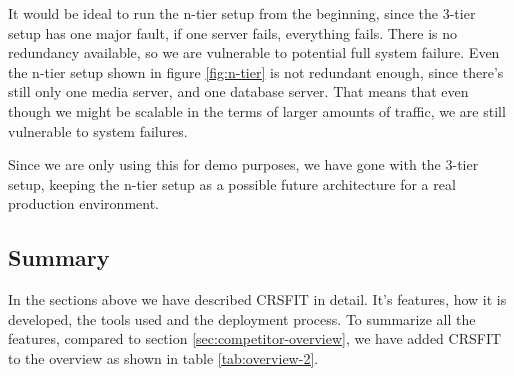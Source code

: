 It would be ideal to run the n-tier setup from the beginning, since the 3-tier setup has one major fault, if one server fails, everything fails. There is no redundancy available, so we are vulnerable to potential full system failure. Even the n-tier setup shown in figure \ref{fig:n-tier} is not redundant enough, since there's still only one media server, and one database server. That means that even though we might be scalable in the terms of larger amounts of traffic, we are still vulnerable to system failures. 



Since we are only using this for demo purposes, we have gone with the 3-tier setup, keeping the n-tier setup as a possible future architecture for a real production environment.






\subsection{Summary}
In the sections above we have described CRSFIT in detail. It's features, how it is developed, the tools used and the deployment process. To summarize all the features, compared to section  \ref{sec:competitor-overview}, we have added CRSFIT to the overview as shown in table  \ref{tab:overview-2}.


